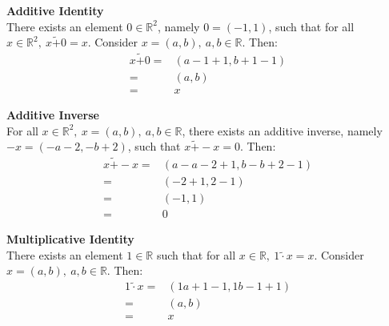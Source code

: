 \documentclass[11pt]{article}
\begin{document}
\begin{flushleft}
\textbf{Additive Identity} \\
\bigskip
There exists an element $0 \in \mathbb{R}^2$, namely $0 = (-1,  1)$, such that for all $x \in \mathbb{R}^2, \ x \tilde{+} 0 = x$. Consider $x = (a, b), \ a,b \in \mathbb{R}$. Then:
\begin{align*}
x \tilde{+} 0 = & (a -1 + 1, b + 1 -1) \\
= & (a, b) \\
= & x
\end{align*}

\textbf{Additive Inverse} \\
\bigskip
For all $x \in \mathbb{R}^2, \ x = (a,b), \ a,b \in \mathbb{R}$, there exists an additive inverse, namely $-x = (-a - 2, -b + 2)$, such that $x \tilde{+} -x = 0$. Then:
\begin{align*}
x \tilde{+} -x = & (a - a -2 + 1, b - b + 2 - 1) \\
= & (-2 + 1, 2 - 1) \\
= & (-1 , 1) \\
= & 0
\end{align*}

\textbf{Multiplicative Identity} \\
\bigskip
There exists an element $1 \in \mathbb{R}$ such that for all $x \in \mathbb{R}, \ 1 \tilde{\cdot} x = x$. Consider $x = (a, b), \ a,b \in \mathbb{R}$. Then:
\begin{align*}
1 \tilde{\cdot} x = & (1a + 1 - 1, 1b - 1 + 1) \\
= & (a, b) \\
= & x
\end{align*}


\end{flushleft}
\end{document}
